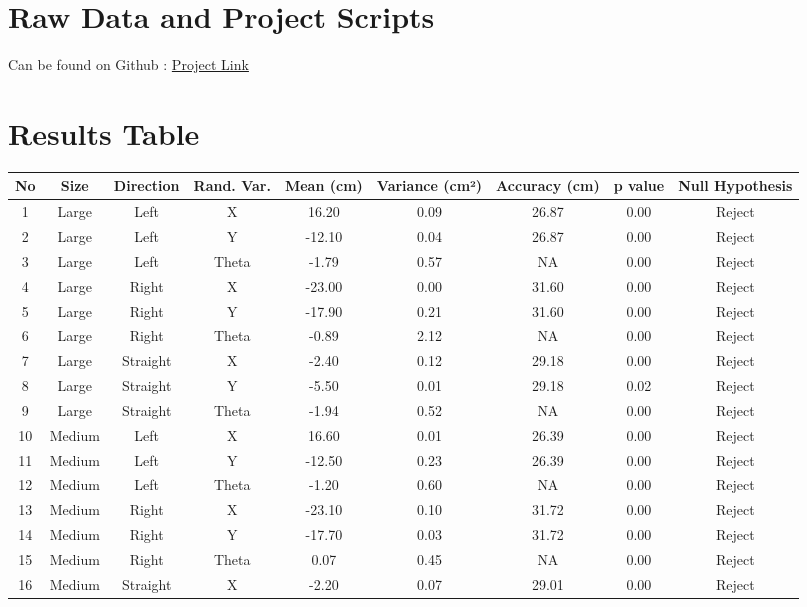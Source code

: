 \section{Raw Data and Project Scripts}

Can be found on Github : \href{https://github.com/Nikhil-URG/KUKA-Youbot-RobotArm_Manipulation/tree/Exp6_results}{Project Link}


\section{Results Table}

\begin{table}[t!]
\centering
\footnotesize
\setlength{\tabcolsep}{4pt}
\begin{tabular}{|c|c|c|c|c|c|c|c|c|}
\hline
No & Size & Direction & Rand. Var. & Mean (cm) & Variance (cm²) & Accuracy (cm) & p value & Null Hypothesis \\ \hline
1 & Large & Left & X & 16.20 & 0.09 & 26.87 & 0.00 & Reject \\
2 & Large & Left & Y & -12.10 & 0.04 & 26.87 & 0.00 & Reject \\
3 & Large & Left & Theta & -1.79 & 0.57 & NA & 0.00 & Reject \\
4 & Large & Right & X & -23.00 & 0.00 & 31.60 & 0.00 & Reject \\
5 & Large & Right & Y & -17.90 & 0.21 & 31.60 & 0.00 & Reject \\
6 & Large & Right & Theta & -0.89 & 2.12 & NA & 0.00 & Reject \\
7 & Large & Straight & X & -2.40 & 0.12 & 29.18 & 0.00 & Reject \\
8 & Large & Straight & Y & -5.50 & 0.01 & 29.18 & 0.02 & Reject \\
9 & Large & Straight & Theta & -1.94 & 0.52 & NA & 0.00 & Reject \\
10 & Medium & Left & X & 16.60 & 0.01 & 26.39 & 0.00 & Reject \\
11 & Medium & Left & Y & -12.50 & 0.23 & 26.39 & 0.00 & Reject \\
12 & Medium & Left & Theta & -1.20 & 0.60 & NA & 0.00 & Reject \\
13 & Medium & Right & X & -23.10 & 0.10 & 31.72 & 0.00 & Reject \\
14 & Medium & Right & Y & -17.70 & 0.03 & 31.72 & 0.00 & Reject \\
15 & Medium & Right & Theta & 0.07 & 0.45 & NA & 0.00 & Reject \\
16 & Medium & Straight & X & -2.20 & 0.07 & 29.01 & 0.00 & Reject \\

\end{tabular}
\end{table}
